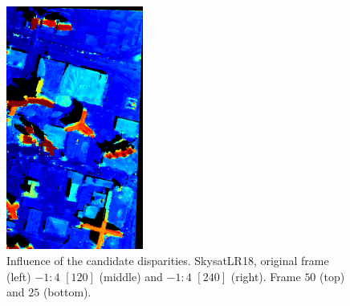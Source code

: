 \documentclass{article}
\theoremstyle{definition}
\begin{document}
\begin{figure}[ht]
 \includegraphics[height=8cm]{images/SkysatLR18_240/1521741442733_dmap_025.png}
 \caption{Influence of the candidate disparities. SkysatLR18, original frame (left) $-1:4$ $[120]$ (middle) and $-1:4$ $[240]$ (right). Frame $50$ (top) and $25$ (bottom).}
 \label{fig:skysatlr18:candidated}
\end{figure}
\end{document}

